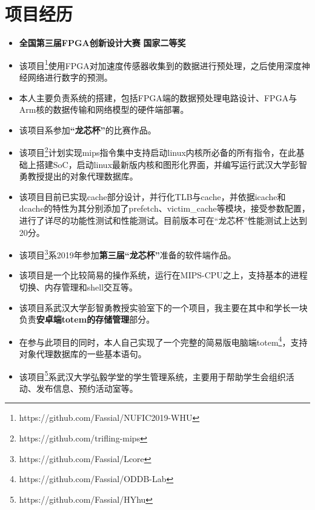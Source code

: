 \documentclass{resume}
\begin{document}
\section{{\bfseries 项目经历}}
\begin{itemize}[parsep=0.2ex]
    \item \textbf{全国第三届FPGA创新设计大赛}  \textbf{国家二等奖}
    \item 该项目\footnote{https://github.com/Fassial/NUFIC2019-WHU}使用FPGA对加速度传感器收集到的数据进行预处理，之后使用深度神经网络进行数字的预测。
    \item 本人主要负责系统的搭建，包括FPGA端的数据预处理电路设计、FPGA与Arm核的数据传输和网络模型的硬件端部署。
\end{itemize}
\begin{itemize}[parsep=0.2ex]
    \item 该项目系参加\textbf{“龙芯杯”}的比赛作品。
    \item 该项目\footnote{https://github.com/trifling-mips}计划实现mips指令集中支持启动linux内核所必备的所有指令，在此基础上搭建SoC，启动linux最新版内核和图形化界面，并编写运行武汉大学彭智勇教授提出的对象代理数据库。
    \item 该项目目前已实现cache部分设计，并行化TLB与cache，并依据icache和dcache的特性为其分别添加了prefetch、victim\_cache等模块，接受参数配置，进行了详尽的功能性测试和性能测试。目前版本可在“龙芯杯”性能测试上达到20分。
\end{itemize}
\begin{itemize}[parsep=0.2ex]
    \item 该项目\footnote{https://github.com/Fassial/Lcore}系2019年参加\textbf{第三届“龙芯杯”}准备的软件端作品。
    \item 该项目是一个比较简易的操作系统，运行在MIPS-CPU之上，支持基本的进程切换、内存管理和shell交互等。
\end{itemize}
\begin{itemize}[parsep=0.2ex]
    \item 该项目系武汉大学彭智勇教授实验室下的一个项目，我主要在其中和学长一块负责\textbf{安卓端totem的存储管理}部分。
    \item 在参与此项目的同时，本人自己实现了一个完整的简易版电脑端totem\footnote{https://github.com/Fassial/ODDB-Lab}，支持对象代理数据库的一些基本语句。
\end{itemize}
\begin{itemize}[parsep=0.2ex]
\item 该项目\footnote{https://github.com/Fassial/HYhu}系武汉大学弘毅学堂的学生管理系统，主要用于帮助学生会组织活动、发布信息、预约活动室等。
\end{itemize}
\end{document}
